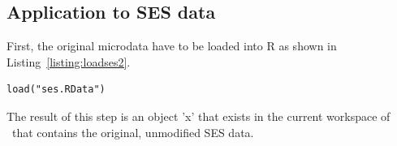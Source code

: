 \documentclass[12pt]{article}
\newcommand{\proglang}[1]{\textsf{#1}}
\begin{document}
% 
%  
% 


\subsection{Application to SES data}\label{app:ses}



First, the original microdata have to be loaded into \proglang{R} as shown in Listing~\ref{listing:loadses2}.

\begin{lstlisting}[numbers=none,captionpos=b, caption={Loading the SES data.}, label=listing:loadses2]
load("ses.RData")
\end{lstlisting}

The result of this step is an object 'x' that exists in the current workspace of \R~that contains the original, unmodified SES data.
\end{document}
